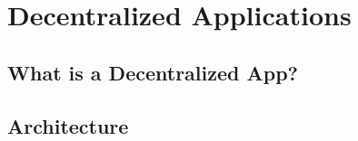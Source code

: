 \section{Decentralized Applications}\label{sec::decentralizedapps}

\subsection{What is a Decentralized App?}

\subsection{Architecture}